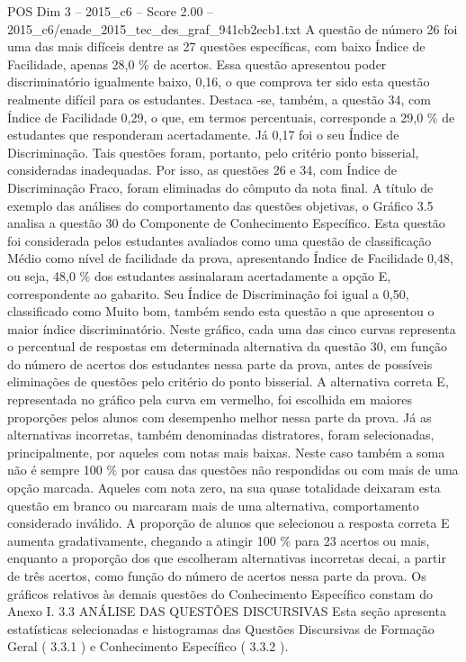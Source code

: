 \begin{textsample}{POS Dim 3 – 2015\_c6 – Score 2.00 – 2015\_c6/enade\_2015\_tec\_des\_graf\_941cb2ecb1.txt}
A questão de número 26 foi uma das mais difíceis dentre as 27 questões específicas, com baixo Índice de Facilidade, apenas 28,0 \% de acertos.
Essa questão apresentou poder discriminatório igualmente baixo, 0,16, o que comprova ter sido esta questão realmente difícil para os estudantes.
Destaca -se, também, a questão 34, com Índice de Facilidade 0,29, o que, em termos percentuais, corresponde a 29,0 \% de estudantes que responderam acertadamente.
Já 0,17 foi o seu Índice de Discriminação.
Tais questões foram, portanto, pelo critério ponto bisserial, consideradas inadequadas.
Por isso, as questões 26 e 34, com Índice de Discriminação Fraco, foram eliminadas do cômputo da nota final.
A título de exemplo das análises do comportamento das questões objetivas, o Gráfico 3.5 analisa a questão 30 do Componente de Conhecimento Específico.
Esta questão foi considerada pelos estudantes avaliados como uma questão de classificação Médio como nível de facilidade da prova, apresentando Índice de Facilidade 0,48, ou seja, 48,0 \% dos estudantes assinalaram acertadamente a opção E, correspondente ao gabarito.
Seu Índice de Discriminação foi igual a 0,50, classificado como Muito bom, também sendo esta questão a que apresentou o maior índice discriminatório.
Neste gráfico, cada uma das cinco curvas representa o percentual de respostas em determinada alternativa da questão 30, em função do número de acertos dos estudantes nessa parte da prova, antes de possíveis eliminações de questões pelo critério do ponto bisserial.
A alternativa correta E, representada no gráfico pela curva em vermelho, foi escolhida em maiores proporções pelos alunos com desempenho melhor nessa parte da prova.
Já as alternativas incorretas, também denominadas distratores, foram selecionadas, principalmente, por aqueles com notas mais baixas.
Neste caso também a soma não é sempre 100 \% por causa das questões não respondidas ou com mais de uma opção marcada.
Aqueles com nota zero, na sua quase totalidade deixaram esta questão em branco ou marcaram mais de uma alternativa, comportamento considerado inválido.
A proporção de alunos que selecionou a resposta correta E aumenta gradativamente, chegando a atingir 100 \% para 23 acertos ou mais, enquanto a proporção dos que escolheram alternativas incorretas decai, a partir de três acertos, como função do número de acertos nessa parte da prova.
Os gráficos relativos às demais questões do Conhecimento Específico constam do Anexo I. 3.3 ANÁLISE DAS QUESTÕES DISCURSIVAS Esta seção apresenta estatísticas selecionadas e histogramas das Questões Discursivas de Formação Geral ( 3.3.1 ) e Conhecimento Específico ( 3.3.2 ).

\end{textsample}
